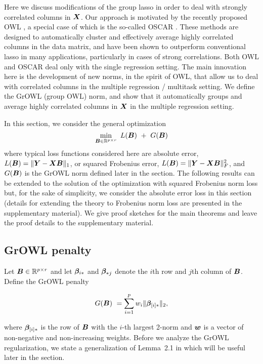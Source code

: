 
Here we discuss modifications of the group lasso in order to deal with strongly
correlated columns in $\boldsymbol{X}$.  Our approach is motivated by the recently proposed
OWL \cite{owl}, a special case of which is the so-called OSCAR \citep{oscar}.
These methods are designed to automatically cluster and effectively average
highly correlated columns in the data matrix, and have been shown to outperform
conventional lasso in many applications, particularly in cases of strong
correlations. Both OWL and OSCAR deal only with the single regression setting.
The main innovation here is the development of new norms, in the spirit of OWL,
that allow us to deal with correlated columns in the multiple regression /
multitask setting. We define the GrOWL (group OWL) norm, and show that it
automatically groups and average highly correlated columns in $\boldsymbol{X}$ in the
multiple regression setting.

In this section, we consider the general optimization
\begin{equation}\label{eqn:L1}
  \min_{\bB \in \R^{p \times r}} \ L(\bB) \ + \ G(\bB)
\end{equation}
 where typical loss functions considered here are absolute error, $L(\boldsymbol{B}) = \|\boldsymbol{Y} - \boldsymbol{X} \boldsymbol{B} \|_1$, or squared Frobenius error, $L(\boldsymbol{B}) = \|\boldsymbol{Y} - \boldsymbol{X} \boldsymbol{B} \|_F^2$, and $G(\boldsymbol{B})$ is the GrOWL norm defined later in the section. The following results can be extended to the solution of the optimization with squared Frobenius norm loss but, for the sake of simplicity, we consider the absolute error loss in this section (details for extending the theory to Frobenius norm loss are presented in the supplementary material). We give proof sketches for the main theorems and leave the proof details to the supplementary material.  

\subsection{GrOWL penalty}
Let $\boldsymbol{B} \in {\mathbb R}^{p\times r}$ and let $\boldsymbol{\beta}_{i {\ast}}$ and $\boldsymbol{\beta}_{{\ast}  j}$ denote
the $i$th row and $j$th column of $\boldsymbol{B}$.  Define the GrOWL penalty

\begin{equation}\label{Eqn:growl}
  G(\bB) \ =  \sum_{i=1}^p w_i \|\bbeta_{[i]\a}\|_2 ,
\end{equation}

where $\boldsymbol{\beta}_{[i]{\ast}}$ is the row of $\boldsymbol{B}$ with the $i$-th largest 2-norm and
$\boldsymbol{w}$ is a vector of non-negative and non-increasing weights.
Before we analyze the GrOWL regularization, we state a generalization of
Lemma~2.1 in \citep{owl} which will be useful later in the section.

